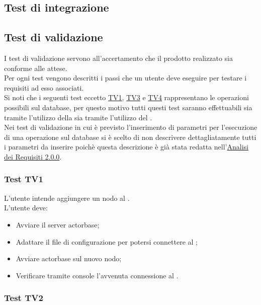 \documentclass{scalatekids-article}
\begin{document}
\subsection{Test di integrazione}

\subsection{Test di validazione}

I test di validazione servono all'accertamento che il prodotto realizzato sia conforme
alle attese.\\
Per ogni test vengono descritti i passi che un utente deve eseguire per testare i
requisiti ad esso associati.\\
Si noti che i seguenti test eccetto \hyperref[sec:TV1]{TV1}, \hyperref[sec:TV3]{TV3} e \hyperref[sec:TV4]{TV4} rappresentano le operazioni possibili 
sul database, per questo motivo tutti questi test saranno effettuabili sia 
tramite l'utilizzo della  sia tramite l'utilizzo del .\\
Nei test di validazione in cui è previsto l'inserimento di parametri per 
l'esecuzione di una operazione sul database si è scelto di non descrivere 
dettagliatamente tutti i parametri da inserire poichè questa descrizione è 
già stata redatta nell'\href{run:../Esterni/AnalisiDeiRequisiti\_v2.0.0.pdf}{Analisi dei Requisiti 2.0.0}.\\

\subsubsection{Test TV1}
\label{sec:TV1}

L'utente intende aggiungere un nodo al .\\
L'utente deve:
\begin{itemize}
\item Avviare il server actorbase;
\item Adattare il file di configurazione per potersi connettere al ;
\item Avviare actorbase sul nuovo nodo;
\item Verificare tramite console l'avvenuta connessione al .
\end{itemize}

\subsubsection{Test TV2}
\end{document}
